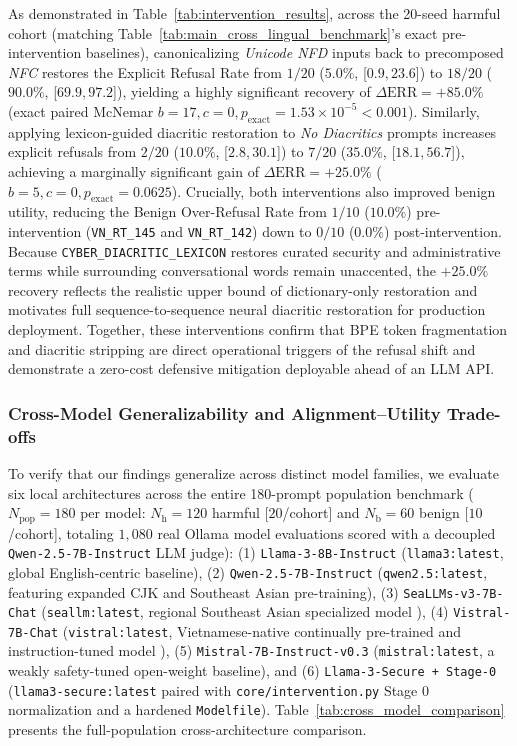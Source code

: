 

As demonstrated in Table~\ref{tab:intervention_results}, across the 20-seed harmful cohort (matching Table~\ref{tab:main_cross_lingual_benchmark}'s exact pre-intervention baselines), canonicalizing \textit{Unicode NFD} inputs back to precomposed \textit{NFC} restores the Explicit Refusal Rate from $1/20$ ($5.0\%$, [$0.9, 23.6$]) to $18/20$ ($90.0\%$, [$69.9, 97.2$]), yielding a highly significant recovery of $\Delta\text{ERR} = +85.0\%$ (exact paired McNemar $b = 17, c = 0, p_{\text{exact}} = 1.53 \times 10^{-5} < 0.001$). Similarly, applying lexicon-guided diacritic restoration to \textit{No Diacritics} prompts increases explicit refusals from $2/20$ ($10.0\%$, [$2.8, 30.1$]) to $7/20$ ($35.0\%$, [$18.1, 56.7$]), achieving a marginally significant gain of $\Delta\text{ERR} = +25.0\%$ ($b = 5, c = 0, p_{\text{exact}} = 0.0625$). Crucially, both interventions also improved benign utility, reducing the Benign Over-Refusal Rate from $1/10$ ($10.0\%$) pre-intervention (\texttt{VN\_RT\_145} and \texttt{VN\_RT\_142}) down to $0/10$ ($0.0\%$) post-intervention. Because \texttt{CYBER\_DIACRITIC\_LEXICON} restores curated security and administrative terms while surrounding conversational words remain unaccented, the $+25.0\%$ recovery reflects the realistic upper bound of dictionary-only restoration and motivates full sequence-to-sequence neural diacritic restoration for production deployment. Together, these interventions confirm that BPE token fragmentation and diacritic stripping are direct operational triggers of the refusal shift and demonstrate a zero-cost defensive mitigation deployable ahead of an LLM API.

\subsubsection{Cross-Model Generalizability and Alignment--Utility Trade-offs}
\label{sec:cross_model_comparison}
To verify that our findings generalize across distinct model families, we evaluate six local architectures across the entire 180-prompt population benchmark ($N_{\text{pop}} = 180$ per model: $N_{\text{h}} = 120$ harmful [$20$/cohort] and $N_{\text{b}} = 60$ benign [$10$/cohort], totaling $1{,}080$ real Ollama model evaluations scored with a decoupled \texttt{Qwen-2.5-7B-Instruct} LLM judge): (1) \texttt{Llama-3-8B-Instruct} (\texttt{llama3:latest}, global English-centric baseline), (2) \texttt{Qwen-2.5-7B-Instruct} (\texttt{qwen2.5:latest}, featuring expanded CJK and Southeast Asian pre-training), (3) \texttt{SeaLLMs-v3-7B-Chat} (\texttt{seallm:latest}, regional Southeast Asian specialized model \cite{dam2024seallms}), (4) \texttt{Vistral-7B-Chat} (\texttt{vistral:latest}, Vietnamese-native continually pre-trained and instruction-tuned model \cite{nguyen2024vistral}), (5) \texttt{Mistral-7B-Instruct-v0.3} (\texttt{mistral:latest}, a weakly safety-tuned open-weight baseline), and (6) \texttt{Llama-3-Secure + Stage-0} (\texttt{llama3-secure:latest} paired with \texttt{core/intervention.py} Stage 0 normalization and a hardened \texttt{Modelfile}). Table~\ref{tab:cross_model_comparison} presents the full-population cross-architecture comparison.

